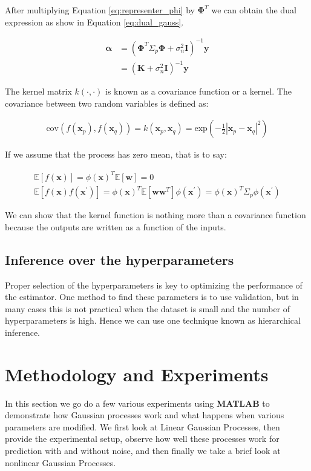 \documentclass[11pt, twoside]{article}   	%
\begin{document}
After multiplying Equation \ref{eq:representer_phi} by $\mathbf{\Phi}^T$ we can obtain the dual 
expression as show in Equation \ref{eq:dual_gauss}.

\begin{align}
\mathbf{\alpha} &= (\mathbf{\Phi}^T \Sigma_p \mathbf{\Phi} + \sigma^2_n \mathbf{I})^{-1} \mathbf{y}\\
&= (\mathbf{K} + \sigma^2_n \mathbf{I})^{-1} \mathbf{y} \label{eq:dual_gauss}
\end{align}

The kernel matrix $k(\cdot, \cdot)$ is known as a covariance function or a kernel. 
The covariance between two random variables is defined as: 

\begin{align}
\text{cov}(f(\mathbf{x}_p), f(\mathbf{x}_q)) = k(\mathbf{x}_p, \mathbf{x}_q) = \text{exp}(-\frac{1}{2}|\mathbf{x}_p - 
\mathbf{x}_q|^2)
\end{align}

If we assume that the process has zero mean, that is to say:

\begin{align}
\mathds{E}[f(\mathbf{x})] = \phi(\mathbf{x})^T \mathds{E}[\mathbf{w}] = 0 \\
\mathds{E}[f(\mathbf{x}) f(\mathbf{x}^{'})] = \phi(\mathbf{x})^T\mathds{E}[\mathbf{ww}^T]\phi(\mathbf{x}^{'}) 
= \phi(\mathbf{x})^T\Sigma_p\phi(\mathbf{x}^{'})
\end{align}

We can show that the kernel function is nothing more than a covariance function because the outputs
are written as a function of the inputs. 


\subsection{Inference over the hyperparameters}
Proper selection of the hyperparameters is key to optimizing the performance of the estimator. One
method to find these parameters is to use validation, but in many cases this is not practical when
the dataset is small and the number of hyperparameters is high. Hence we can use one technique 
known as hierarchical inference. 


\section{Methodology and Experiments}
In this section we go do a few various experiments using \textbf{MATLAB} to demonstrate how
Gaussian processes work and what happens when various parameters are modified. We first look
at Linear Gaussian Processes, then provide the experimental setup, observe how well these
processes work for prediction with and without noise, and then finally we take a brief look
at nonlinear Gaussian Processes. 
\end{document}
